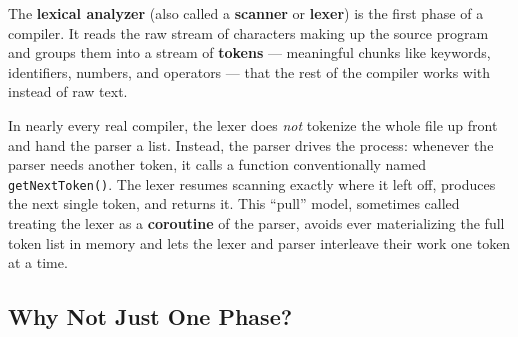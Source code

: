 \documentclass[full-course-notes.tex]{subfiles}
\begin{document}
\dbtag The \textbf{lexical analyzer} (also called a \textbf{scanner} or \textbf{lexer}) is the
first phase of a compiler. It reads the raw stream of characters making up the source program
and groups them into a stream of \textbf{tokens} --- meaningful chunks like keywords,
identifiers, numbers, and operators --- that the rest of the compiler works with instead of raw
text.

\begin{center}
\end{center}

\begin{coreidea}
In nearly every real compiler, the lexer does \emph{not} tokenize the whole file up front and
hand the parser a list. Instead, the parser drives the process: whenever the parser needs another
token, it calls a function conventionally named \texttt{getNextToken()}. The lexer resumes
scanning exactly where it left off, produces the next single token, and returns it. This
``pull'' model, sometimes called treating the lexer as a \textbf{coroutine} of the parser, avoids
ever materializing the full token list in memory and lets the lexer and parser interleave their
work one token at a time.
\end{coreidea}

\subsection{Why Not Just One Phase?}
\label{sec:l3-why-separate}
\end{document}

